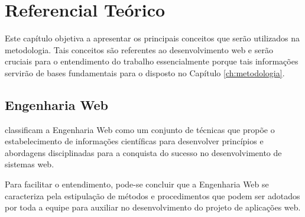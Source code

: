 \chapter{Referencial Teórico}
\label{ch:referencial}
\hspace{2.5cm}

Este capítulo objetiva a apresentar os principais conceitos que serão utilizados na metodologia. Tais conceitos são referentes ao desenvolvimento web e serão cruciais para o entendimento do trabalho essencialmente porque tais informações servirão de bases fundamentais para o disposto no Capítulo \ref{ch:metodologia}.


\hspace{2.5cm}

\section{Engenharia Web}
\label{sec:engenhariaweb}
\hspace{2.5cm}

 classificam a Engenharia Web como um conjunto de técnicas que propõe o estabelecimento de informações científicas para desenvolver princípios e abordagens disciplinadas para a conquista do sucesso no desenvolvimento de sistemas web. 

Para facilitar o entendimento, pode-se concluir que a Engenharia Web se caracteriza pela estipulação de métodos e procedimentos que podem ser adotados por toda a equipe para auxiliar no desenvolvimento do projeto de aplicações web.

